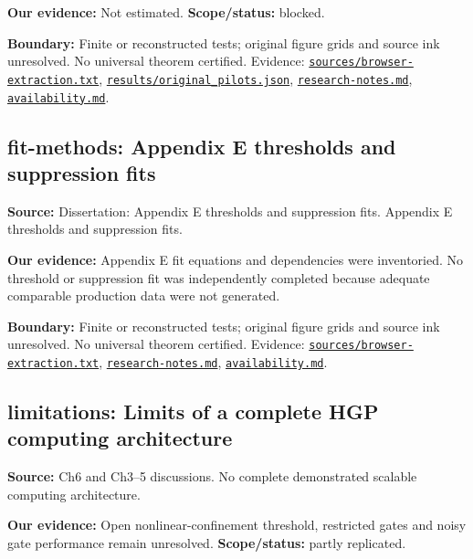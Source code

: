 \documentclass[11pt]{article}
\begin{document}
\textbf{Our evidence:} Not estimated. \textbf{Scope/status:} blocked.

\textbf{Boundary:} Finite or reconstructed tests; original figure grids and source ink unresolved. No universal theorem certified. Evidence: \href{https://github.com/alectionary/vibe-math/blob/master/formalization/quintavalle-hgp/sources/browser-extraction.txt}{\nolinkurl{sources/browser-extraction.txt}}, \href{https://github.com/alectionary/vibe-math/blob/master/formalization/quintavalle-hgp/results/original_pilots.json}{\nolinkurl{results/original_pilots.json}}, \href{https://github.com/alectionary/vibe-math/blob/master/formalization/quintavalle-hgp/research-notes.md}{\nolinkurl{research-notes.md}}, \href{https://github.com/alectionary/vibe-math/blob/master/formalization/quintavalle-hgp/availability.md}{\nolinkurl{availability.md}}.
\subsection{fit-methods: Appendix E thresholds and suppression fits}
\label{claim:fit-methods}
\textbf{Source:} Dissertation: Appendix E thresholds and suppression fits. Appendix E thresholds and suppression fits.

\textbf{Our evidence:} Appendix E fit equations and dependencies were inventoried. No threshold or suppression fit was independently completed because adequate comparable production data were not generated.

\textbf{Boundary:} Finite or reconstructed tests; original figure grids and source ink unresolved. No universal theorem certified. Evidence: \href{https://github.com/alectionary/vibe-math/blob/master/formalization/quintavalle-hgp/sources/browser-extraction.txt}{\nolinkurl{sources/browser-extraction.txt}}, \href{https://github.com/alectionary/vibe-math/blob/master/formalization/quintavalle-hgp/research-notes.md}{\nolinkurl{research-notes.md}}, \href{https://github.com/alectionary/vibe-math/blob/master/formalization/quintavalle-hgp/availability.md}{\nolinkurl{availability.md}}.
\subsection{limitations: Limits of a complete HGP computing architecture}
\label{claim:limitations}
\textbf{Source:} Ch6 and Ch3--5 discussions. No complete demonstrated scalable computing architecture.

\textbf{Our evidence:} Open nonlinear-confinement threshold, restricted gates and noisy gate performance remain unresolved. \textbf{Scope/status:} partly replicated.
\end{document}
